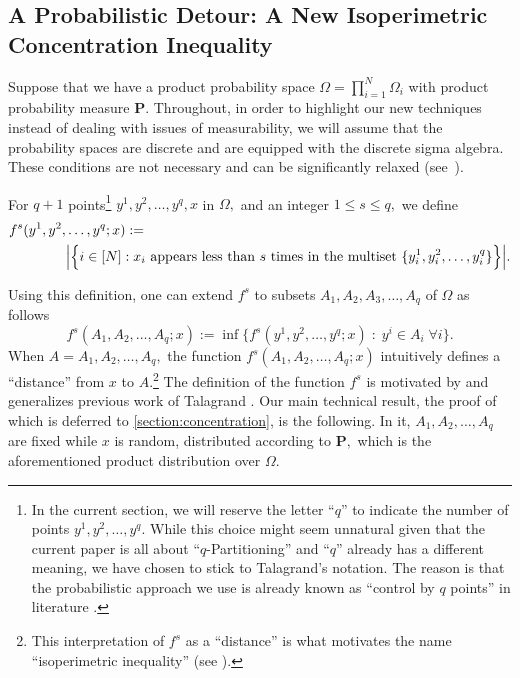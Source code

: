 \documentclass[11pt]{article}%
\numberwithin{theorem}{subsection}
\newcommand{\prob}{\mathbf{P}}
\begin{document}
\subsection{A Probabilistic Detour: A New Isoperimetric Concentration Inequality}
\label{section:detourisoperimetry}
Suppose that we have a product probability space $\Omega = \prod_{i=1}^N \Omega_i$ with product probability measure $\prob.$ Throughout, in order to highlight our new techniques instead of dealing with issues of measurability, we will assume that the probability spaces are discrete and are equipped with the discrete sigma algebra. These conditions are not necessary and can be significantly relaxed (see~\cite[Section 2.1]{Talagrand01}).

For  $q+1$ points\footnote{In the current section, we will reserve the letter ``$q$'' to indicate the number of points $y^1, y^2,\ldots, y^{q}.$ While this choice might seem unnatural given that the current paper is all about ``$q$-Partitioning''  and ``$q$'' already has a different meaning, we have chosen to stick to Talagrand's notation. The reason is that the probabilistic approach we use is already known as ``control by $q$ points'' in literature \cite[Section 3]{Talagrand01}.} $y^1, y^2,\ldots, y^{q}, x$ in $\Omega,$ and an integer $1\le s \le q,$ we define
\begin{equation}\label{eq:definefs}
\begin{split}
    f^s(y^1, y^2,  & \ldots, y^q; x) :=\\
       & \Big{|}\Big{\{}i\in [N]: x_i \text{ appears less than $s$ times in the multiset }  \{y^1_i, y^2_i, \ldots, y^q_i\}\Big{\}}\Big{|}.
\end{split}
\end{equation}
       
\noindent
Using this definition, one can extend $f^s$ to subsets $A_1, A_2, A_3, \ldots, A_q$ of $\Omega$ as follows
$$
       f^s(A_1, A_2, \ldots, A_q; x) := 
       \inf\{f^s(y^1, y^2, \ldots, y^q; x) \; : \; y^i\in A_i\; \forall i\}.
$$
When $A = A_1, A_2, \ldots, A_q,$ the function $f^s(A_1, A_2, \ldots, A_q; x)$ intuitively defines a ``distance'' from $x$ to $A.$\footnote{This interpretation of $f^s$ as a ``distance'' is what motivates the name ``isoperimetric inequality'' (see \cite{Talagrand01}).} The definition of the function $f^s$ is motivated by and generalizes previous work of Talagrand \cite{Talagrand01,Talagrand96}. Our main technical result, the proof of which is deferred to 
\cref{section:concentration}, is the following. In it, $A_1, A_2, \ldots, A_q$ are fixed while $x$ is random, distributed according to $\prob,$ which is the aforementioned product distribution over $\Omega.$
\end{document}
